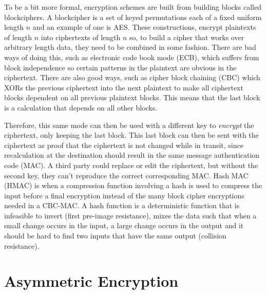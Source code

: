\documentclass[ %
                    author={Samuel Russell},
                supervisor={Prof. Bogdan Warinschi},
                    degree={MEng},
                     title={Innocuous Ciphertexts},
                  subtitle={The DE-CENSOR Scheme},
                      type={research},
                      year={2018} ]{dissertation}
\begin{document}
To be a bit more formal, encryption schemes are built from building blocks called blockciphers.
A blockcipher is a set of keyed permutations each of a fixed uniform length $n$ and an example of one is AES.
These constructions, encrypt plaintexts of length $n$ into ciphertexts of length $n$ so, to build a cipher that works over arbitrary length data, they need to be combined in some fashion.
There are bad ways of doing this, such as electronic code book mode (ECB), which suffers from block independence so certain patterns in the plaintext are obvious in the ciphertext.
There are also good ways, such as cipher block chaining (CBC) which XORs the previous ciphertext into the next plaintext to make all ciphertext blocks dependent on all previous plaintext blocks.
This means that the last block is a calculation that depends on all other blocks.

Therefore, this same mode can then be used with a different key to \textit{encrypt} the ciphertext, only keeping the last block. This last block can then be sent with the ciphertext as proof that the ciphertext is not changed while in transit, since recalculation at the destination should result in the same message authentication code (MAC).
A third party could replace or edit the ciphertext, but without the second key, they can't reproduce the correct corresponding MAC.
Hash MAC (HMAC) is when a compression function involving a hash is used to compress the input before a final encryption instead of the many block cipher encryptions needed in a CBC-MAC.
A hash function is a deterministic function that is infeasible to invert (first pre-image resistance), mixes the data such that when a small change occurs in the input, a large change occurs in the output and it should be hard to find two inputs that have the same output (collision resistance).

\section{Asymmetric Encryption}
\end{document}
